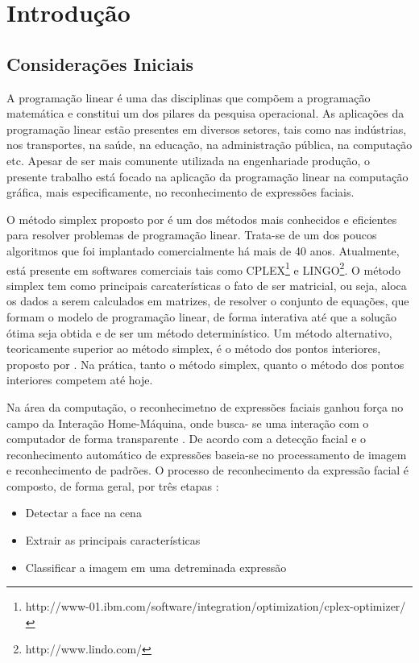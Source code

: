 \chapter{Introdução}

\section{Considerações Iniciais}
A programação linear é uma das disciplinas que compõem a programação matemática e constitui um dos pilares da pesquisa operacional. As aplicações da programação linear estão presentes em diversos setores, tais como nas indústrias, nos transportes, na saúde, na educação, na administração pública, na computação etc. Apesar de ser mais comunente utilizada na engenhariade produção, o presente trabalho está focado na aplicação da programação linear na computação gráfica, mais especificamente, no reconhecimento de expressões faciais.

O método simplex proposto por  é um dos métodos mais conhecidos e eficientes para resolver problemas de programação linear. Trata-se de um dos poucos algoritmos que foi implantado comercialmente há mais de 40 anos. Atualmente, está presente em softwares comerciais tais como CPLEX\footnote{http://www-01.ibm.com/software/integration/optimization/cplex-optimizer/} e LINGO\footnote{http://www.lindo.com/}. O método simplex tem como principais carcaterísticas o fato de ser matricial, ou seja, aloca os dados a serem calculados em matrizes, de resolver o conjunto de equações, que formam o modelo de programação linear, de forma interativa até que a solução ótima seja obtida e de ser um método determinístico. Um método alternativo, teoricamente superior ao método simplex, é o método dos pontos interiores, proposto por . Na prática, tanto o método simplex, quanto o método dos pontos interiores competem até hoje.  

Na área da computação, o reconhecimetno de expressões faciais ganhou força no campo da Interação Home-Máquina, onde busca- se uma interação com o computador de forma transparente \cite{Elizabeth}. De acordo com  a detecção facial e o reconhecimento automático de expressões baseia-se no processamento de imagem e reconhecimento de padrões. O processo de reconhecimento da expressão facial é composto, de forma geral, por três etapas \cite{Elizabeth}:
\begin{itemize}
\item Detectar a face na cena
\item Extrair as principais características
\item Classificar a imagem em uma detreminada expressão
\end{itemize}

